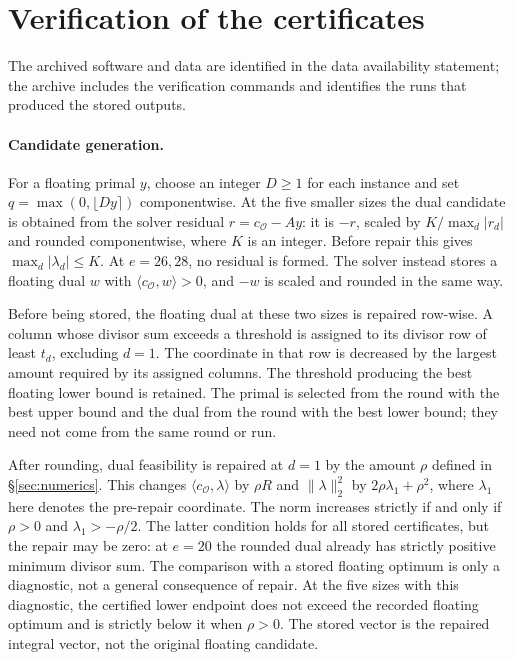 \documentclass[11pt,a4paper]{article}
\theoremstyle{plain}
\theoremstyle{definition}
\theoremstyle{remark}
\newcommand{\vR}{\mathcal{O}}
\begin{document}
\appendix

\section{Verification of the certificates}\label{app:verify}
The archived software and data are identified in the data availability statement; the archive includes
the verification commands and identifies the runs that produced the stored outputs.

\paragraph{Candidate generation.}\label{app:generation}
For a floating primal $y$, choose an integer $D\ge1$ for each instance and set
$q=\max(0,\lfloor Dy\rceil)$ componentwise.
At the five smaller sizes the dual candidate is obtained from the solver residual
$r=c_{\vR}-Ay$: it is $-r$, scaled by $K/\max_d|r_d|$ and rounded componentwise, where $K$ is an integer.
Before repair this gives $\max_d|\lambda_d|\le K$.
At $e=26,28$, no residual is formed. The solver instead stores a floating dual $w$ with
$\langle c_{\vR},w\rangle>0$, and $-w$ is scaled and rounded in the same way.

Before being stored, the floating dual at these two sizes is repaired row-wise. A column whose
divisor sum exceeds a threshold is assigned to its divisor row of least $t_d$, excluding $d=1$.
The coordinate in that row is decreased by the largest amount required by its assigned columns.
The threshold producing the best floating lower bound is retained. The primal is selected from the
round with the best upper bound and the dual from the round with the best lower bound; they need
not come from the same round or run.

After rounding, dual feasibility is repaired at $d=1$ by the amount $\rho$ defined in
\S\ref{sec:numerics}. This changes $\langle c_{\vR},\lambda\rangle$ by $\rho R$ and
$\|\lambda\|_2^2$ by $2\rho\lambda_1+\rho^2$, where $\lambda_1$ here denotes the pre-repair coordinate.
The norm increases strictly if and only if $\rho>0$ and $\lambda_1>-\rho/2$.
The latter condition holds for all stored certificates, but the repair may be zero: at $e=20$ the
rounded dual already has strictly positive minimum divisor sum.
The comparison with a stored floating optimum is only a diagnostic, not a general consequence of
repair. At the five sizes with this diagnostic, the certified lower endpoint does not exceed the
recorded floating optimum and is strictly below it when $\rho>0$. The stored vector is the repaired
integral vector, not the original floating candidate.
\end{document}
